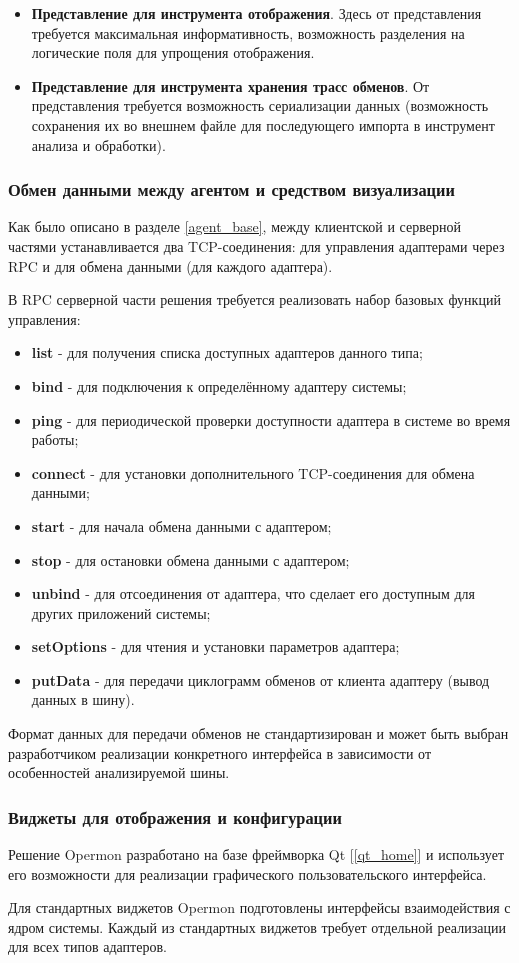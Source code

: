 \begin{itemize}
 \item \textbf{Представление для инструмента отображения}. Здесь от представления требуется максимальная информативность, возможность разделения на логические поля для упрощения отображения.
 \item \textbf{Представление для инструмента хранения трасс обменов}. От представления требуется возможность сериализации данных (возможность сохранения их во внешнем файле для последующего импорта в инструмент анализа и обработки).
\end{itemize}

\subsubsection{Обмен данными между агентом и средством визуализации}

Как было описано в разделе \ref{agent_base}, между клиентской и серверной частями устанавливается два TCP-соединения: для управления адаптерами через RPC и для обмена данными (для каждого адаптера).

В RPC серверной части решения требуется реализовать набор базовых функций управления:

\begin{itemize}
 \item \textbf{list} - для получения списка доступных адаптеров данного типа;
 \item \textbf{bind} - для подключения к определённому адаптеру системы;
 \item \textbf{ping} - для периодической проверки доступности адаптера в системе во время работы;
 \item \textbf{connect} - для установки дополнительного TCP-соединения для обмена данными;
 \item \textbf{start} - для начала обмена данными с адаптером;
 \item \textbf{stop} - для остановки обмена данными с адаптером;
 \item \textbf{unbind} - для отсоединения от адаптера, что сделает его доступным для других приложений системы;
 \item \textbf{setOptions} - для чтения и установки параметров адаптера;
 \item \textbf{putData} - для передачи циклограмм обменов от клиента адаптеру (вывод данных в шину).
\end{itemize}


Формат данных для передачи обменов не стандартизирован и может быть выбран разработчиком реализации конкретного интерфейса в зависимости от особенностей анализируемой шины.

\subsubsection{Виджеты для отображения и конфигурации}

Решение Opermon разработано на базе фреймворка Qt [\ref{qt_home}] и использует его возможности для реализации графического пользовательского интерфейса.

Для стандартных виджетов Opermon подготовлены интерфейсы взаимодействия с ядром системы. Каждый из стандартных виджетов требует отдельной реализации для всех типов адаптеров.
